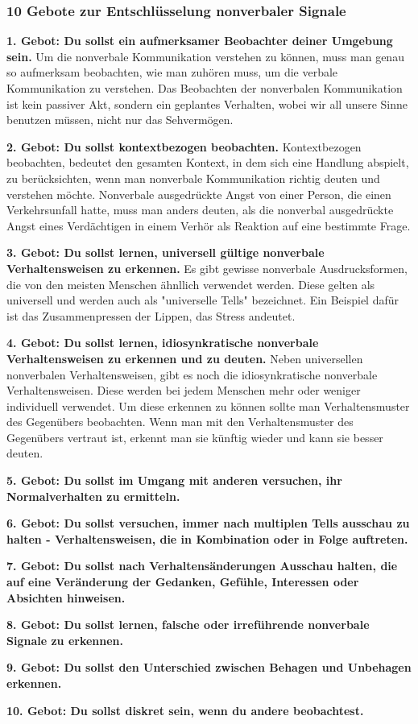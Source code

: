 \subsubsection{10 Gebote zur Entschlüsselung nonverbaler Signale}
\hskip 12pt\relax\textbf{1. Gebot: Du sollst ein aufmerksamer Beobachter deiner Umgebung sein.}
Um die nonverbale Kommunikation verstehen zu können, muss man genau so aufmerksam beobachten, wie man zuhören muss, um die verbale Kommunikation zu verstehen.
Das Beobachten der nonverbalen Kommunikation ist kein passiver Akt, sondern ein geplantes Verhalten, wobei wir all unsere
Sinne benutzen müssen, nicht nur das Sehvermögen.

\par\textbf{2. Gebot: Du sollst kontextbezogen beobachten.}
Kontextbezogen beobachten, bedeutet den gesamten Kontext, in dem sich eine Handlung abspielt, zu berücksichten, wenn man nonverbale
Kommunikation richtig deuten und verstehen möchte. Nonverbale ausgedrückte Angst von einer Person, die einen Verkehrsunfall hatte, muss man anders deuten,
als die nonverbal ausgedrückte Angst eines Verdächtigen in einem Verhör als Reaktion auf eine bestimmte Frage.

\par\textbf{3. Gebot: Du sollst lernen, universell gültige nonverbale Verhaltensweisen zu erkennen.}
Es gibt gewisse nonverbale Ausdrucksformen, die von den meisten Menschen ähnllich verwendet werden.
Diese gelten als universell und werden auch als "universelle Tells" bezeichnet. Ein Beispiel dafür ist das Zusammenpressen der Lippen, das Stress andeutet.

\par\textbf{4. Gebot: Du sollst lernen, idiosynkratische nonverbale Verhaltensweisen zu erkennen und zu deuten.}
Neben universellen nonverbalen Verhaltensweisen, gibt es noch die idiosynkratische nonverbale Verhaltensweisen.
Diese werden bei jedem Menschen mehr oder weniger individuell verwendet. Um diese erkennen zu können
sollte man Verhaltensmuster des Gegenübers beobachten. Wenn man mit den Verhaltensmuster des Gegenübers vertraut ist, 
erkennt man sie künftig wieder und kann sie besser deuten. 

\par\textbf{5. Gebot: Du sollst im Umgang mit anderen versuchen, ihr Normalverhalten zu ermitteln.}
\par\textbf{6. Gebot: Du sollst versuchen, immer nach multiplen Tells ausschau zu halten - Verhaltensweisen, die in Kombination oder in Folge auftreten.}
\par\textbf{7. Gebot: Du sollst nach Verhaltensänderungen Ausschau halten, die auf eine Veränderung der Gedanken, Gefühle, Interessen oder Absichten hinweisen.}
\par\textbf{8. Gebot: Du sollst lernen, falsche oder irreführende nonverbale Signale zu erkennen.}
\par\textbf{9. Gebot: Du sollst den Unterschied zwischen Behagen und Unbehagen erkennen.}
\par\textbf{10. Gebot: Du sollst diskret sein, wenn du andere beobachtest.}
